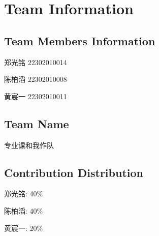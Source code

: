 \section{Team Information}
\label{sec:group}

\subsection{Team Members Information}

郑光铭 22302010014

陈柏滔 22302010008

黄宸一 22302010011

\subsection{Team Name}

专业课和我作队

\subsection{Contribution Distribution}

郑光铭: 40\%

陈柏滔: 40\%

黄宸一: 20\%

\nocite{sym11101223}
\nocite{SANDHYA2024301663}
\nocite{18512}
\nocite{LiuHaoyue2021RGBN}
\nocite{article}
\nocite{8977568}
